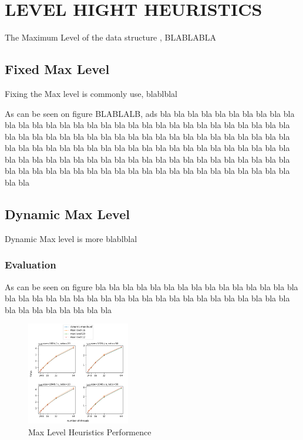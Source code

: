 \documentclass{article}
\begin{document}
\section{LEVEL HIGHT HEURISTICS}
\label{sec:lhh}

The Maximum Level of the data structure , BLABLABLA

\subsection{Fixed Max Level}
\label{ssec:fml}

Fixing the Max level is commonly use, blablblal

As can be seen on figure BLABLALB, ads
bla bla bla bla bla bla
bla bla bla bla bla 
bla bla bla bla bla bla
bla bla bla bla bla 
bla bla bla bla bla bla
bla bla bla bla bla 
bla bla bla bla bla bla
bla bla bla bla bla bla
bla bla bla bla bla 
bla bla bla bla bla bla
bla bla bla bla bla 
bla bla bla bla bla bla
bla bla bla bla bla 
bla bla bla bla bla bla
bla bla bla bla bla bla
bla bla bla bla bla 
bla bla bla bla bla bla
bla bla bla bla bla 
bla bla bla bla bla bla
bla bla bla bla bla 
bla bla bla bla bla bla

\subsection{Dynamic Max Level}
\label{ssec:dml}

Dynamic Max level is more blablblal

\subsubsection{Evaluation}
\label{sssec:ml-evl}

As can be seen on figure bla bla bla bla bla 
bla bla bla bla bla bla
bla bla bla bla bla 
bla bla bla bla bla bla
bla bla bla bla bla 
bla bla bla bla bla bla
bla bla bla bla bla 
bla bla bla bla bla bla

\begin{figure}
	\caption{Max Level Heuristics Performence}
	\centering
	\includegraphics[width=0.4\textwidth]{max-level_plot}
\end{figure}
\end{document}
